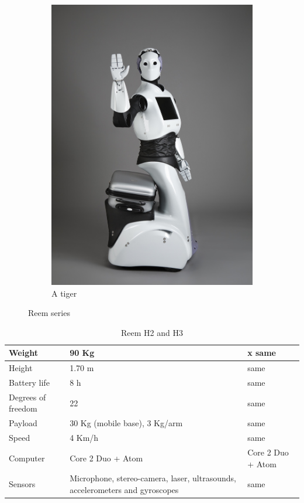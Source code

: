 \begin{figure}
       \begin{subfigure}[b]{0.3\textwidth}
           \includegraphics[width=\textwidth]{figures/reemh3}
           \caption{A tiger}
           \label{fig:tiger}
       \end{subfigure}
       \caption{Reem series}
       \label{fig:reemseries}
\end{figure}

\begin{table}[ht]
    \centering
    \begin{tabularx}{\linewidth}{| X | X | X |}
    \hline
    Weight & 90 Kg & x same\\ \hline
    Height & 1.70 m & same \\ \hline
    Battery life & 8 h & same \\ \hline
    Degrees of freedom & 22 & same \\ \hline
    Payload & 30 Kg (mobile base), 3 Kg/arm & same\\ \hline
    Speed & 4 Km/h & same\\ \hline
    Computer & Core 2 Duo + Atom & Core 2 Duo + Atom \\ \hline
    Sensors & Microphone, stereo-camera, laser, ultrasounds, accelerometers and gyroscopes & same \\
    \hline
    \end{tabularx}
    \caption{Reem H2 and H3}
    \label{tab:rh2}
\end{table}


